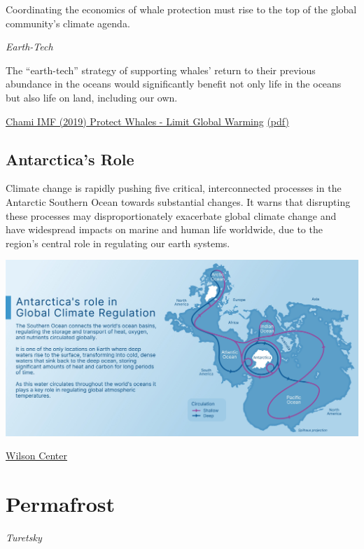 \documentclass[
]{book}
\begin{document}
Coordinating the economics of whale protection must rise to the top of the global community's climate agenda.

\emph{Earth-Tech}

The ``earth-tech'' strategy of supporting whales' return to their previous abundance in the oceans would significantly benefit not only life in the oceans but also life on land, including our own.

\href{https://www.imf.org/external/pubs/ft/fandd/2019/12/natures-solution-to-climate-change-chami.htm}{Chami IMF (2019) Protect Whales - Limit Global Warming}
\href{pdf/Chami_2021_Whale_Pump.pdf}{(pdf)}

\hypertarget{antarcticas-role}{%
\section{Antarctica's Role}\label{antarcticas-role}}

Climate change is rapidly pushing five critical, interconnected processes in the Antarctic Southern Ocean towards substantial changes. It warns that disrupting these processes may disproportionately exacerbate global climate change and have widespread impacts on marine and human life worldwide, due to the region's central role in regulating our earth systems.

\includegraphics{fig/Antarctica_Circulation.jpeg}

\href{https://www.wilsoncenter.org/publication/polar-perspectives-no-5-climate-change-and-southern-ocean-resilience}{Wilson Center}

\hypertarget{permafrost}{%
\chapter{Permafrost}\label{permafrost}}

\emph{Turetsky}
\end{document}
